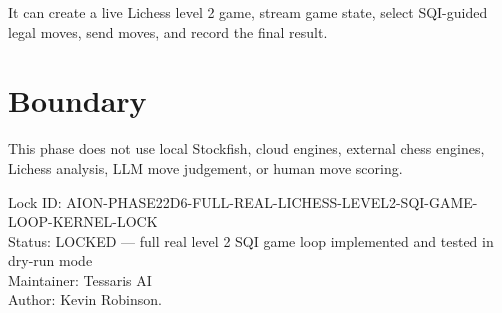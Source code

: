 \documentclass[11pt,a4paper]{article}
\begin{document}
It can create a live Lichess level 2 game, stream game state, select SQI-guided legal moves, send moves, and record the final result.

\section{Boundary}

This phase does not use local Stockfish, cloud engines, external chess engines, Lichess analysis, LLM move judgement, or human move scoring.

\bigskip

\noindent
Lock ID: AION-PHASE22D6-FULL-REAL-LICHESS-LEVEL2-SQI-GAME-LOOP-KERNEL-LOCK\\
Status: LOCKED --- full real level 2 SQI game loop implemented and tested in dry-run mode\\
Maintainer: Tessaris AI\\
Author: Kevin Robinson.
\end{document}
